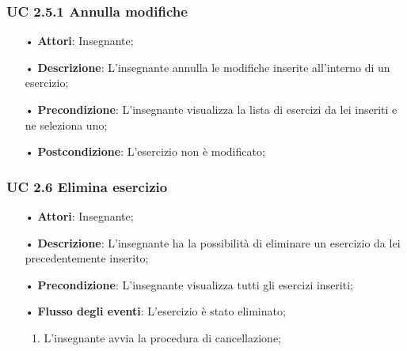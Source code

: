\subsubsection{UC 2.5.1 Annulla modifiche}
\begin{itemize}
	\item[•] \textbf{Attori}: Insegnante;
	\item[•] \textbf{Descrizione}: L'insegnante annulla le modifiche inserite all'interno di un esercizio; 
	\item[•] \textbf{Precondizione}: L'insegnante visualizza la lista di esercizi da lei inseriti e ne seleziona uno;
	\item[•] \textbf{Postcondizione}: L'esercizio non è modificato;
\end{itemize}

\subsubsection{UC 2.6 Elimina esercizio}
\begin{itemize}
	\item[•] \textbf{Attori}: Insegnante;
	\item[•] \textbf{Descrizione}: L'insegnante ha la possibilità di eliminare un esercizio da lei precedentemente inserito;
	\item[•] \textbf{Precondizione}: L'insegnante visualizza tutti gli esercizi inseriti;
	\item[•] \textbf{Flusso degli eventi}: L'esercizio è stato eliminato;
		\begin{enumerate}
			\item L'insegnante avvia la procedura di cancellazione;			
		\end{enumerate}
\end{itemize}